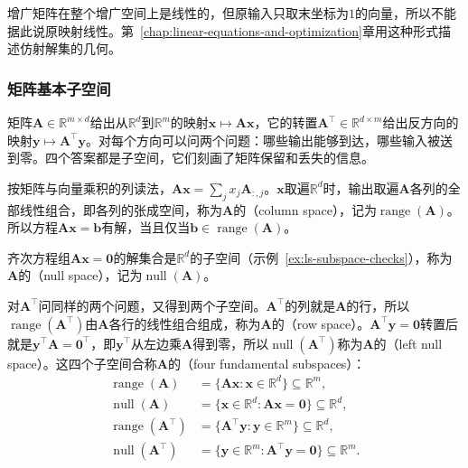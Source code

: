 增广矩阵在整个增广空间上是线性的，但原输入只取末坐标为$1$的向量，所以不能据此说原映射线性。第~\ref{chap:linear-equations-and-optimization}章用这种形式描述仿射解集的几何。

\subsubsection{矩阵基本子空间}
\label{sec:ls-four-fundamental-subspaces}

矩阵$\bm A\in\mathbb R^{m\times d}$给出从$\mathbb R^d$到$\mathbb R^m$的映射$\bm x\mapsto\bm A\bm x$，它的转置$\bm A^\top\in\mathbb R^{d\times m}$给出反方向的映射$\bm y\mapsto\bm A^\top\bm y$。对每个方向可以问两个问题：哪些输出能够到达，哪些输入被送到零。四个答案都是子空间，它们刻画了矩阵保留和丢失的信息。

按矩阵与向量乘积的列读法，$\bm A\bm x=\sum_jx_j\bm A_{:,j}$。$\bm x$取遍$\mathbb R^d$时，输出取遍$\bm A$各列的全部线性组合，即各列的张成空间，称为$\bm A$的（column space），记为$\operatorname{range}(\bm A)$。所以方程$\bm A\bm x=\bm b$有解，当且仅当$\bm b\in\operatorname{range}(\bm A)$。

齐次方程组$\bm A\bm x=\bm0$的解集合是$\mathbb R^d$的子空间（示例~\ref{ex:ls-subspace-checks}），称为$\bm A$的（null space），记为$\operatorname{null}(\bm A)$。

对$\bm A^\top$问同样的两个问题，又得到两个子空间。$\bm A^\top$的列就是$\bm A$的行，所以$\operatorname{range}(\bm A^\top)$由$\bm A$各行的线性组合组成，称为$\bm A$的（row space）。$\bm A^\top\bm y=\bm0$转置后就是$\bm y^\top\bm A=\bm0^\top$，即$\bm y^\top$从左边乘$\bm A$得到零，所以$\operatorname{null}(\bm A^\top)$称为$\bm A$的（left null space）。这四个子空间合称$\bm A$的（four fundamental subspaces）：
\begin{equation}
 \begin{aligned}
  \operatorname{range}(\bm A)&=\{\bm A\bm x:\bm x\in\mathbb R^d\}\subseteq\mathbb R^m,\\
  \operatorname{null}(\bm A)&=\{\bm x\in\mathbb R^d:\bm A\bm x=\bm0\}\subseteq\mathbb R^d,\\
  \operatorname{range}(\bm A^\top)&=\{\bm A^\top\bm y:\bm y\in\mathbb R^m\}\subseteq\mathbb R^d,\\
  \operatorname{null}(\bm A^\top)&=\{\bm y\in\mathbb R^m:\bm A^\top\bm y=\bm0\}\subseteq\mathbb R^m.
 \end{aligned}
 \label{eq:ls-four-fundamental-subspaces}
\end{equation}

